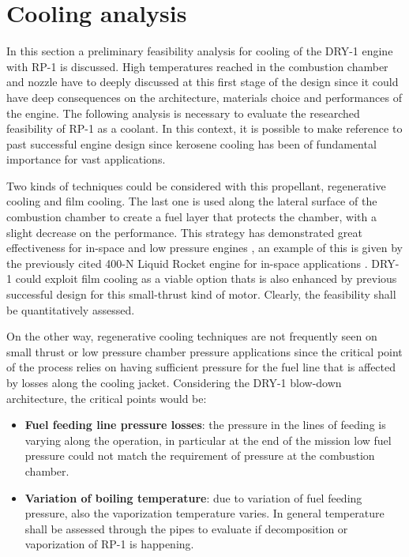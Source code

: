 \section{Cooling analysis}
\label{sec:cooling}

In this section a preliminary feasibility analysis for cooling of the DRY-1 engine with RP-1 is discussed.
High temperatures reached in the combustion chamber and nozzle have to deeply discussed at this first stage of the design since it could have deep consequences on the architecture, materials choice and performances of the engine. The following analysis is necessary to evaluate the researched feasibility of RP-1 as a coolant. In this context, it is possible to make reference to past successful engine design since kerosene cooling has been of fundamental importance for vast applications.

Two kinds of techniques could be considered with this propellant, regenerative cooling and film cooling. The last one is used along the lateral surface of the combustion chamber to create a fuel layer that protects the chamber, with a slight decrease on the performance. This strategy has demonstrated great effectiveness for in-space and low pressure engines \cite{cambridge}, an example of this is given by the previously cited 400-N Liquid Rocket engine for in-space applications \cite{ariane_datasheet}. DRY-1 could exploit film cooling as a viable option thats is also enhanced by previous successful design for this small-thrust kind of motor. Clearly, the feasibility shall be quantitatively assessed.

On the other way, regenerative cooling techniques are not frequently seen on small thrust or low pressure chamber pressure applications since the critical point of the process relies on having sufficient pressure for the fuel line that is affected by losses along the cooling jacket. Considering the DRY-1 blow-down architecture, the critical points would be:

\begin{itemize}
    \item \textbf{Fuel feeding line pressure losses}: the pressure in the lines of feeding is varying along the operation, in particular at the end of the mission low fuel pressure could not match the requirement of pressure at the combustion chamber.
    \item \textbf{Variation of boiling temperature}: due to variation of fuel feeding pressure, also the vaporization temperature varies. In general temperature shall be assessed through the pipes to evaluate if decomposition or vaporization of RP-1 is happening.
\end{itemize}

